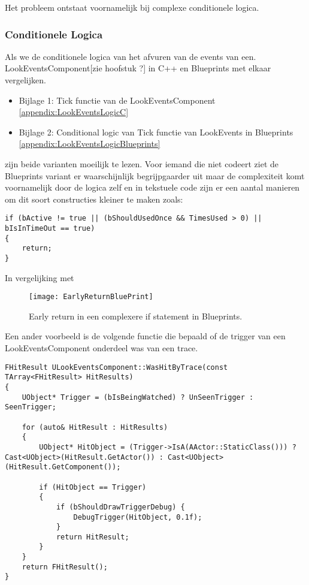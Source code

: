 Het probleem ontstaat voornamelijk bij complexe conditionele logica.

\subsubsection{Conditionele Logica}

Als we de conditionele logica van het afvuren van de events van een.
LookEventsComponent[zie hoofstuk ?] in C++ en Blueprints met elkaar vergelijken.

\begin{itemize}
	\item Bijlage 1: Tick functie van de LookEventsComponent \ref{appendix:LookEventsLogicC}
	\item Bijlage 2: Conditional logic van Tick functie van LookEvents in Blueprints \ref{appendix:LookEventsLogicBlueprints}
\end{itemize}

zijn beide varianten moeilijk te lezen. Voor iemand die niet codeert ziet de Blueprints variant er waarschijnlijk begrijpgaarder uit maar de complexiteit komt voornamelijk door de logica zelf en in tekstuele code zijn er een aantal manieren om dit soort constructies kleiner te maken zoals:

\begin{lstlisting}[caption=Early return in een complexere if statement in C++]
if (bActive != true || (bShouldUsedOnce && TimesUsed > 0) || bIsInTimeOut == true) 
{
	return;
}
\end{lstlisting}
In vergelijking met 

\begin{figure}[!ht]
  \centering
    \texttt{[image: EarlyReturnBluePrint]}
    \caption{Early return in een complexere if statement in Blueprints.}
\end{figure}

Een ander voorbeeld is de volgende functie die bepaald of de trigger van een LookEventsComponent onderdeel was van een trace.

\begin{lstlisting}[caption=Een functie die kijkt of de huidige component geraakt is door een trace]
FHitResult ULookEventsComponent::WasHitByTrace(const TArray<FHitResult> HitResults) 
{
	UObject* Trigger = (bIsBeingWatched) ? UnSeenTrigger : SeenTrigger;

	for (auto& HitResult : HitResults)
	{
		UObject* HitObject = (Trigger->IsA(AActor::StaticClass())) ? Cast<UObject>(HitResult.GetActor()) : Cast<UObject>(HitResult.GetComponent());	

		if (HitObject == Trigger)
		{
			if (bShouldDrawTriggerDebug) {
				DebugTrigger(HitObject, 0.1f);
			}
			return HitResult;
		}
	}
	return FHitResult();
}
\end{lstlisting}

